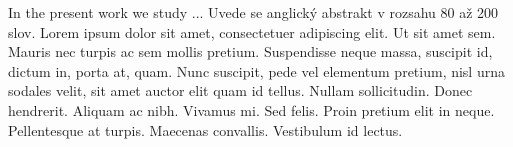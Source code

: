 In the present work we study
... Uvede se anglický abstrakt v rozsahu 80 až 200 slov. Lorem ipsum
dolor sit amet, consectetuer adipiscing elit. Ut sit amet sem. Mauris
nec turpis ac sem mollis pretium. Suspendisse neque massa, suscipit
id, dictum in, porta at, quam. Nunc suscipit, pede vel elementum pretium,
nisl urna sodales velit, sit amet auctor elit quam id tellus. Nullam
sollicitudin. Donec hendrerit. Aliquam ac nibh. Vivamus mi. Sed felis.
Proin pretium elit in neque. Pellentesque at turpis. Maecenas convallis.
Vestibulum id lectus.